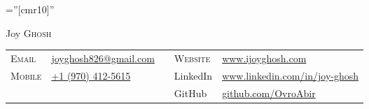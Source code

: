 \documentclass[a4paper,10pt]{article}
\begin{document}
\vspace{-\baselineskip}
\pagestyle{empty} %

\font\fb=''[cmr10]'' %

\par{\centering
    {\Huge Joy \textsc{Ghosh}
  }\bigskip\par}

\begin{tabular}{p{1.5cm}p{4cm}p{5cm}p{1.5cm}p{5cm}}
     \textsc{Email} & \href{mailto:joyghosh826@gmail.com}{joyghosh826@gmail.com}
     & & 
     \textsc{Website} & \href{www.ijoyghosh.com}{www.ijoyghosh.com} \\
     \textsc{Mobile} & \href{tel:+19704125615}{+1 (970) 412-5615} & & LinkedIn & \href{https://www.linkedin.com/in/joy-ghosh}{www.linkedin.com/in/joy-ghosh} \\
     & & & GitHub & \href{https://github.com/OvroAbir}{github.com/OvroAbir}
\end{tabular}



\end{document}
